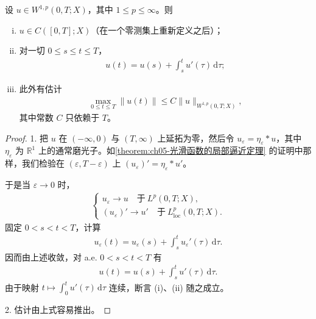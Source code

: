\documentclass[../../main.tex]{subfiles}
\begin{document}
\begin{theorem}[抽象空间中的微积分]\label{theorem:ch05-抽象微积分}设 $u\in W^{1,p}(0,T;X)$，其中 $1\leqslant p\leqslant\infty$。则
\begin{enumerate}[(i)]
\item $u\in C([0,T];X)$（在一个零测集上重新定义之后）；
\item 对一切 $0\leqslant s\leqslant t\leqslant T$，
\begin{align*}
u(t)=u(s)+\int_{s}^{t}u'(\tau)\,\mathrm{d}\tau;
\end{align*}
\item 此外有估计
\begin{align}
\max_{0\leqslant t\leqslant T}\|u(t)\|\leqslant C\|u\|_{W^{1,p}(0,T;X)},
\end{align}
其中常数 $C$ 只依赖于 $T$。
\end{enumerate}
\end{theorem}
\begin{proof}

1. 把 $u$ 在 $(-\infty,0)$ 与 $(T,\infty)$ 上延拓为零，然后令 $u_{\varepsilon}=\eta_{\varepsilon}*u$，其中 $\eta_{\varepsilon}$ 为 $\mathbb{R}^{1}$ 上的通常磨光子。如\cref{theorem:ch05-光滑函数的局部逼近定理} 的证明中那样，我们检验在 $(\varepsilon,T-\varepsilon)$ 上 $(u_{\varepsilon})'=\eta_{\varepsilon}*u'$。

于是当 $\varepsilon\to 0$ 时，
\begin{align}
\begin{cases}
u_{\varepsilon}\to u\quad\text{于}\ L^{p}(0,T;X),\\
(u_{\varepsilon})'\to u'\quad\text{于}\ L^{p}_{\mathrm{loc}}(0,T;X).
\end{cases}
\end{align}
固定 $0<s<t<T$，计算
\begin{align*}
u_{\varepsilon}(t)=u_{\varepsilon}(s)+\int_{s}^{t}u_{\varepsilon}'(\tau)\,\mathrm{d}\tau.
\end{align*}
因而由上述收敛，对 a.e. $0<s<t<T$ 有
\begin{align}
u(t)=u(s)+\int_{s}^{t}u'(\tau)\,\mathrm{d}\tau.
\end{align}
由于映射 $t\mapsto\int_{0}^{t}u'(\tau)\,\mathrm{d}\tau$ 连续，断言 (i)、(ii) 随之成立。

2. 估计由上式容易推出。
\end{proof}
\end{document}
